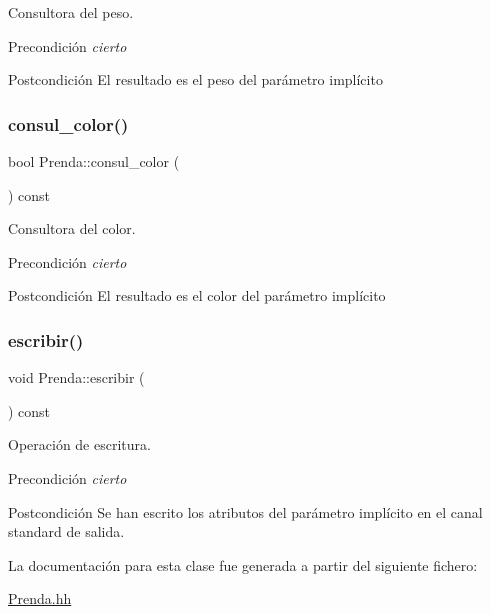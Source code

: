 Consultora del peso. 

\begin{DoxyPrecond}{Precondición}
{\itshape cierto} 
\end{DoxyPrecond}
\begin{DoxyPostcond}{Postcondición}
El resultado es el peso del parámetro implícito 
\end{DoxyPostcond}
\mbox{\label{class_prenda_a81575030ecbaabf350091f54612033f4}} 
\subsubsection{\texorpdfstring{consul\+\_\+color()}{consul\_color()}}
{\footnotesize\ttfamily bool Prenda\+::consul\+\_\+color (\begin{DoxyParamCaption}{ }\end{DoxyParamCaption}) const}



Consultora del color. 

\begin{DoxyPrecond}{Precondición}
{\itshape cierto} 
\end{DoxyPrecond}
\begin{DoxyPostcond}{Postcondición}
El resultado es el color del parámetro implícito 
\end{DoxyPostcond}
\mbox{\label{class_prenda_a6261b483bb78e47266e353fdd11c3077}} 
\subsubsection{\texorpdfstring{escribir()}{escribir()}}
{\footnotesize\ttfamily void Prenda\+::escribir (\begin{DoxyParamCaption}{ }\end{DoxyParamCaption}) const}



Operación de escritura. 

\begin{DoxyPrecond}{Precondición}
{\itshape cierto} 
\end{DoxyPrecond}
\begin{DoxyPostcond}{Postcondición}
Se han escrito los atributos del parámetro implícito en el canal standard de salida. 
\end{DoxyPostcond}


La documentación para esta clase fue generada a partir del siguiente fichero\+:\begin{DoxyCompactItemize}
\item 
\hyperlink{_prenda_8hh}{Prenda.\+hh}\end{DoxyCompactItemize}
